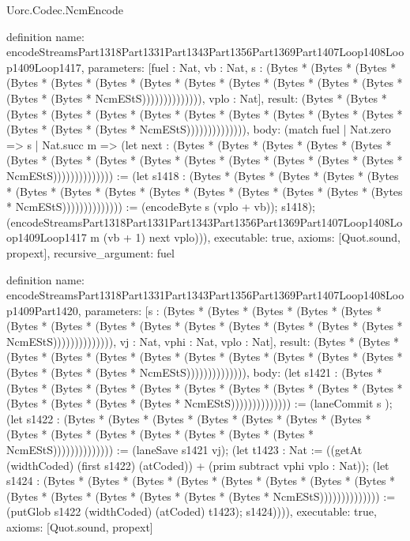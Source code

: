 \begin{lexlean}{Uorc.Codec.NcmEncode}
\begin{semanticmodule}
definition{
  name: encodeStreamsPart1318Part1331Part1343Part1356Part1369Part1407Loop1408Loop1409Loop1417,
  parameters: [fuel : Nat, vb : Nat, s : (Bytes * (Bytes * (Bytes * (Bytes * (Bytes * (Bytes * (Bytes * (Bytes * (Bytes * (Bytes * (Bytes * (Bytes * (Bytes * (Bytes * NcmEStS)))))))))))))), vplo : Nat],
  result: (Bytes * (Bytes * (Bytes * (Bytes * (Bytes * (Bytes * (Bytes * (Bytes * (Bytes * (Bytes * (Bytes * (Bytes * (Bytes * (Bytes * NcmEStS)))))))))))))),
  body: (match fuel
    | Nat.zero => s
    | Nat.succ m => (let next : (Bytes * (Bytes * (Bytes * (Bytes * (Bytes * (Bytes * (Bytes * (Bytes * (Bytes * (Bytes * (Bytes * (Bytes * (Bytes * (Bytes * NcmEStS)))))))))))))) := (let s1418 : (Bytes * (Bytes * (Bytes * (Bytes * (Bytes * (Bytes * (Bytes * (Bytes * (Bytes * (Bytes * (Bytes * (Bytes * (Bytes * (Bytes * NcmEStS)))))))))))))) := (encodeByte s (vplo + vb)); s1418); (encodeStreamsPart1318Part1331Part1343Part1356Part1369Part1407Loop1408Loop1409Loop1417 m (vb + 1) next vplo))),
  executable: true,
  axioms: [Quot.sound, propext],
  recursive_argument: fuel
}

definition{
  name: encodeStreamsPart1318Part1331Part1343Part1356Part1369Part1407Loop1408Loop1409Part1420,
  parameters: [s : (Bytes * (Bytes * (Bytes * (Bytes * (Bytes * (Bytes * (Bytes * (Bytes * (Bytes * (Bytes * (Bytes * (Bytes * (Bytes * (Bytes * NcmEStS)))))))))))))), vj : Nat, vphi : Nat, vplo : Nat],
  result: (Bytes * (Bytes * (Bytes * (Bytes * (Bytes * (Bytes * (Bytes * (Bytes * (Bytes * (Bytes * (Bytes * (Bytes * (Bytes * (Bytes * NcmEStS)))))))))))))),
  body: (let s1421 : (Bytes * (Bytes * (Bytes * (Bytes * (Bytes * (Bytes * (Bytes * (Bytes * (Bytes * (Bytes * (Bytes * (Bytes * (Bytes * (Bytes * NcmEStS)))))))))))))) := (laneCommit s ); (let s1422 : (Bytes * (Bytes * (Bytes * (Bytes * (Bytes * (Bytes * (Bytes * (Bytes * (Bytes * (Bytes * (Bytes * (Bytes * (Bytes * (Bytes * NcmEStS)))))))))))))) := (laneSave s1421 vj); (let t1423 : Nat := ((getAt (widthCoded) (first s1422) (atCoded)) + (prim subtract vphi vplo : Nat)); (let s1424 : (Bytes * (Bytes * (Bytes * (Bytes * (Bytes * (Bytes * (Bytes * (Bytes * (Bytes * (Bytes * (Bytes * (Bytes * (Bytes * (Bytes * NcmEStS)))))))))))))) := (putGlob s1422 (widthCoded) (atCoded) t1423); s1424)))),
  executable: true,
  axioms: [Quot.sound, propext]
}


\end{semanticmodule}
\end{lexlean}

